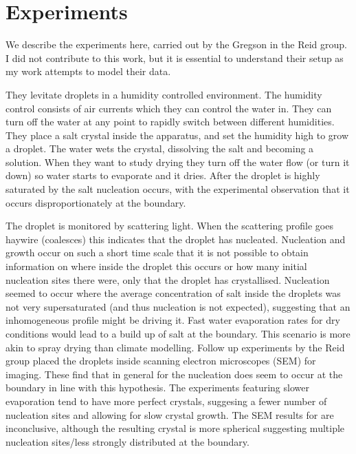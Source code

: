 \documentclass[11pt,twoside]{report}
\begin{document}
\section{Experiments}

We describe the experiments here, carried out by the Gregson in the Reid group.
I did not contribute to this work, but it is essential to understand their setup as my work attempts to model their data.

They levitate droplets in a humidity controlled environment.
The humidity control consists of air currents which they can control the water in.
They can turn off the water at any point to rapidly switch between different humidities.
They place a salt crystal inside the apparatus, and set the humidity high to grow a droplet.
The water wets the crystal, dissolving the salt and becoming a solution.
When they want to study drying they turn off the water flow (or turn it down) so water starts to evaporate and it dries.
After the droplet is highly saturated by the salt nucleation occurs, with the experimental observation that it occurs disproportionately at the boundary.

The droplet is monitored by scattering light.
When the scattering profile goes haywire (coalesces) this indicates that the droplet has nucleated.
Nucleation and growth occur on such a short time scale that it is not possible to obtain information on where inside the droplet this occurs or how many initial nucleation sites there were, only that the droplet has crystallised.
Nucleation seemed to occur where the average concentration of salt inside the droplets was not very supersaturated (and thus nucleation is not expected), suggesting that an inhomogeneous profile might be driving it.
Fast water evaporation rates for dry conditions would lead to a build up of salt at the boundary.
This scenario is more akin to spray drying than climate modelling.
Follow up experiments by the Reid group placed the droplets inside scanning electron microscopes (SEM) for imaging.
These find that in general for  the nucleation does seem to occur at the boundary in line with this hypothesis.
The experiments featuring slower evaporation tend to have more perfect crystals, suggesing a fewer number of nucleation sites and allowing for slow crystal growth.
The SEM results for  are inconclusive, although the resulting crystal is more spherical suggesting multiple nucleation sites/less strongly distributed at the boundary.
\end{document}
